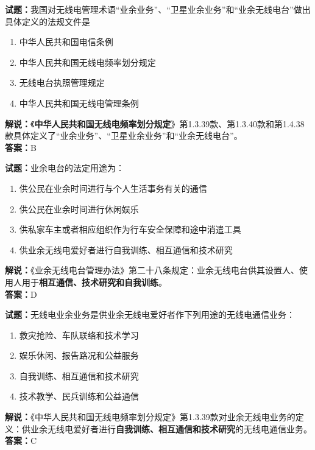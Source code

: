 \documentclass{ctexbook}
\begin{document}
\bigskip




\noindent\textbf{试题：}我国对无线电管理术语“业余业务”、“卫星业余业务”和“业余无线电台”做出具体定义的法规文件是 
\begin{enumerate}[leftmargin=3em]
\item 中华人民共和国电信条例
\item 中华人民共和国无线电频率划分规定
\item 无线电台执照管理规定
\item 中华人民共和国无线电管理条例
\end{enumerate}
\textbf{解说：}《\textbf{中华人民共和国无线电频率划分规定}》第1.3.39款、第1.3.40款和第1.4.38款具体定义了“业余业务”、“卫星业余业务”和“业余无线电台”。\\\noindent\textbf{答案：}B

\bigskip




\noindent\textbf{试题：}业余电台的法定用途为：
\begin{enumerate}[leftmargin=3em]
\item 供公民在业余时间进行与个人生活事务有关的通信
\item 供公民在业余时间进行休闲娱乐
\item 供私家车主或者相应组织作为行车安全保障和途中消遣工具
\item 供业余无线电爱好者进行自我训练、相互通信和技术研究
\end{enumerate}
\noindent\textbf{解说：}《业余无线电台管理办法》第二十八条规定：业余无线电台供其设置人、使用人用于\textbf{相互通信、技术研究和自我训练}。\\\noindent\textbf{答案：}D

\bigskip




\noindent\textbf{试题：}无线电业余业务是供业余无线电爱好者作下列用途的无线电通信业务：
\begin{enumerate}[leftmargin=3em]
\item 救灾抢险、车队联络和技术学习
\item 娱乐休闲、报告路况和公益服务
\item 自我训练、相互通信和技术研究
\item 技术教学、民兵训练和公益通信
\end{enumerate}
\noindent\textbf{解说：}《中华人民共和国无线电频率划分规定》第1.3.39款对业余无线电业务的定义：供业余无线电爱好者进行\textbf{自我训练、相互通信和技术研究}的无线电通信业务。\\\noindent\textbf{答案：}C
\end{document}
